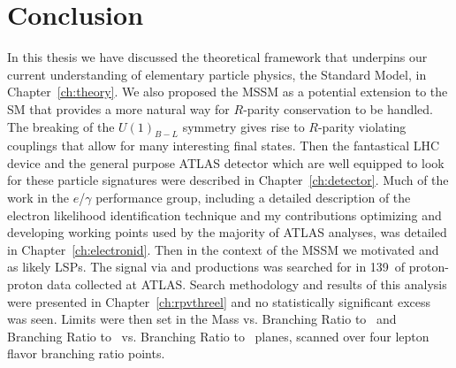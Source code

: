 \chapter[Conclusion][Conclusion]{Conclusion}

In this thesis we have discussed the theoretical framework that underpins our current understanding of elementary particle physics, the Standard Model, in Chapter~\ref{ch:theory}.
We also proposed the \BL MSSM as a potential extension to the SM that provides a more natural way for $R$-parity conservation to be handled.
The breaking of the $U(1)_{B-L}$ symmetry gives rise to $R$-parity violating couplings that allow for many interesting final states.
Then the fantastical LHC device and the general purpose ATLAS detector which are well equipped to look for these particle signatures were described in Chapter~\ref{ch:detector}.
Much of the work in the $e$/$\gamma$ performance group, including a detailed description of the electron likelihood identification technique and my contributions  optimizing and developing working points used by the majority of ATLAS analyses, was detailed in Chapter~\ref{ch:electronid}.
Then in the context of the \BL MSSM we motivated \chone and \none as likely LSPs.
The signal \triLepDecay via \CCsignal and \CNsignal productions was searched for in 139~\ifb of proton-proton data collected at ATLAS.
Search methodology and results of this analysis were presented in Chapter~\ref{ch:rpvthreel} and no statistically significant excess was seen.
Limits were then set in the Mass vs. Branching Ratio to \Zboson\ and Branching Ratio to \Zboson\  vs. Branching Ratio to \Hboson\ planes, scanned over four lepton flavor branching ratio points. 


